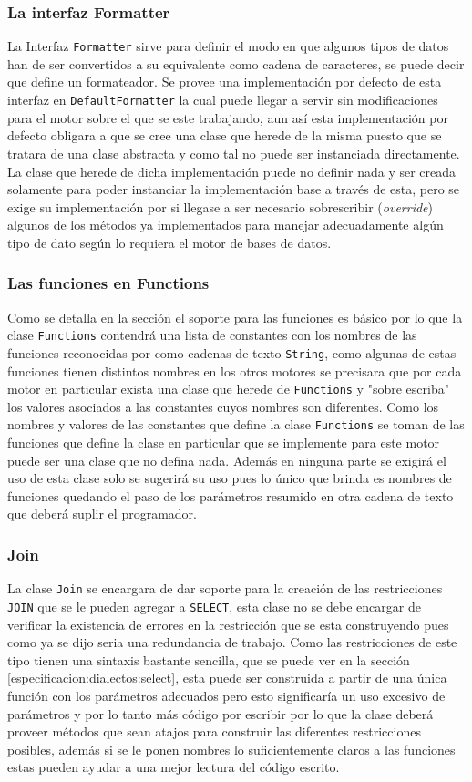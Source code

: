 \subsubsection{La interfaz Formatter}
La Interfaz \verb=Formatter= sirve para definir el modo en que algunos tipos de datos han de ser convertidos a su equivalente como cadena de caracteres, se puede decir que define un formateador. Se provee una implementación por defecto de esta interfaz en \verb=DefaultFormatter= la cual puede llegar a servir sin modificaciones para el motor sobre el que se este trabajando, aun así esta implementación por defecto obligara a que se cree una clase que herede de la misma puesto que se tratara de una clase abstracta y como tal no puede ser instanciada directamente. La clase que herede de dicha implementación puede no definir nada y ser creada solamente para poder instanciar la implementación base a través de esta, pero se exige su implementación por si llegase a ser necesario sobrescribir (\textit{override}) algunos de los métodos ya implementados para manejar adecuadamente algún tipo de dato según lo requiera el motor de bases de datos.
%
\subsubsection{Las funciones  en Functions}
Como se detalla en la sección  el soporte para las funciones es básico por lo que la clase \verb=Functions= contendrá una lista de constantes con los nombres de las funciones reconocidas por \jj como cadenas de texto \verb=String=, como algunas de estas funciones tienen distintos nombres en los otros motores se precisara que por cada motor en particular exista una clase que herede de \verb=Functions= y "sobre escriba" los valores asociados a las constantes cuyos nombres son diferentes. Como los nombres y valores de las constantes que define la clase \verb=Functions= se toman de las funciones que define \s la clase en particular que se implemente para este motor puede ser una clase que no defina nada. Además en ninguna parte se exigirá el uso de esta clase solo se sugerirá su uso pues lo único que brinda es nombres de funciones quedando el paso de los parámetros resumido en otra cadena de texto que deberá suplir el programador.  
%
\subsubsection{Join}
La clase \verb=Join= se encargara de dar soporte para la creación de las restricciones \verb=JOIN= que se le pueden agregar a \verb=SELECT=, esta clase no se debe encargar de verificar la existencia de errores en la restricción que se esta construyendo pues como ya se dijo seria una redundancia de trabajo. Como las restricciones de este tipo tienen una sintaxis bastante sencilla, que se puede ver en la sección \ref{especificacion:dialectos:select}, esta puede ser construida a partir de una única función con los parámetros adecuados pero esto significaría un uso excesivo de parámetros y por lo tanto más código por escribir por lo que la clase deberá proveer métodos que sean atajos para construir las diferentes restricciones posibles, además si se le ponen nombres lo suficientemente claros a las funciones estas pueden ayudar a una mejor lectura del código escrito.
%
